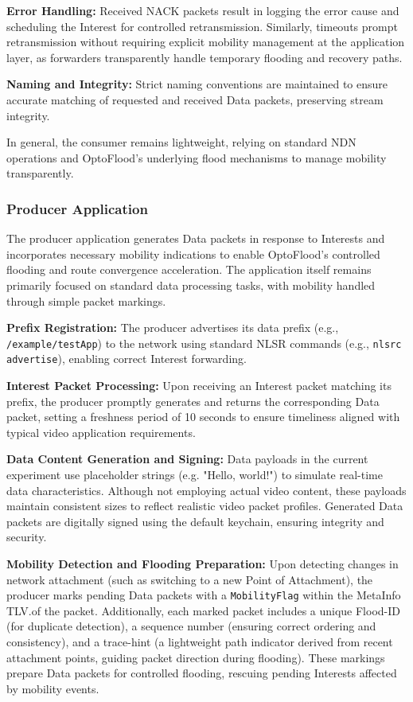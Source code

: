 \documentclass[conference]{IEEEtran}
\begin{document}
\textbf{Error Handling:}
Received NACK packets result in logging the error cause and scheduling the Interest for controlled retransmission. Similarly, timeouts prompt retransmission without requiring explicit mobility management at the application layer, as forwarders transparently handle temporary flooding and recovery paths.

\textbf{Naming and Integrity:}
Strict naming conventions are maintained to ensure accurate matching of requested and received Data packets, preserving stream integrity.

In general, the consumer remains lightweight, relying on standard NDN operations and OptoFlood’s underlying flood mechanisms to manage mobility transparently.

\subsubsection{Producer Application}

The producer application generates Data packets in response to Interests and incorporates necessary mobility indications to enable OptoFlood’s controlled flooding and route convergence acceleration. The application itself remains primarily focused on standard data processing tasks, with mobility handled through simple packet markings.

\textbf{Prefix Registration:}
The producer advertises its data prefix (e.g., \texttt{/example/testApp}) to the network using standard NLSR commands (e.g., \texttt{nlsrc advertise}), enabling correct Interest forwarding.

\textbf{Interest Packet Processing:}
Upon receiving an Interest packet matching its prefix, the producer promptly generates and returns the corresponding Data packet, setting a freshness period of 10 seconds to ensure timeliness aligned with typical video application requirements.

\textbf{Data Content Generation and Signing:}
Data payloads in the current experiment use placeholder strings (e.g. "Hello, world!") to simulate real-time data characteristics. Although not employing actual video content, these payloads maintain consistent sizes to reflect realistic video packet profiles. Generated Data packets are digitally signed using the default keychain, ensuring integrity and security.

\textbf{Mobility Detection and Flooding Preparation:}
Upon detecting changes in network attachment (such as switching to a new Point of Attachment), the producer marks pending Data packets with a \texttt{MobilityFlag} within the MetaInfo TLV.of the packet. Additionally, each marked packet includes a unique Flood-ID (for duplicate detection), a sequence number (ensuring correct ordering and consistency), and a trace-hint (a lightweight path indicator derived from recent attachment points, guiding packet direction during flooding). These markings prepare Data packets for controlled flooding, rescuing pending Interests affected by mobility events.
\end{document}
